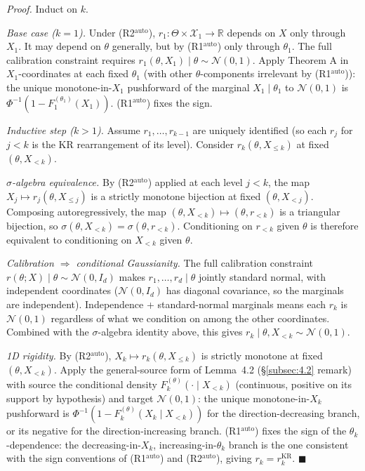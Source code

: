 \documentclass[11pt]{article}
\begin{document}
\emph{Proof.} Induct on \(k\).

\emph{Base case (\(k = 1\)).} Under (R2\(^\mathrm{auto}\)),
\(r_1: \Theta \times \mathcal{X}_1 \to \mathbb{R}\) depends on \(X\)
only through \(X_1\). It may depend on \(\theta\) generally, but by
(R1\(^\mathrm{auto}\)) only through \(\theta_1\). The full calibration
constraint requires
\(r_1(\theta, X_1) \mid \theta \sim \mathcal{N}(0,1)\). Apply Theorem A
in \(X_1\)-coordinates at each fixed \(\theta_1\) (with other
\(\theta\)-components irrelevant by (R1\(^\mathrm{auto}\))): the unique
monotone-in-\(X_1\) pushforward of the marginal \(X_1 \mid \theta_1\) to
\(\mathcal{N}(0,1)\) is \(\Phi^{-1}(1 - F_1^{(\theta_1)}(X_1))\).
(R1\(^\mathrm{auto}\)) fixes the sign.

\emph{Inductive step (\(k > 1\)).} Assume
\(r_1, \ldots, r_{k-1}\) are uniquely identified (so each \(r_j\) for
\(j < k\) is the KR rearrangement of its level). Consider
\(r_k(\theta, X_{\le k})\) at fixed \((\theta, X_{<k})\).

\emph{\(\sigma\)-algebra equivalence.} By (R2\(^\mathrm{auto}\)) applied
at each level \(j < k\), the map \(X_j \mapsto r_j(\theta, X_{\le j})\)
is a strictly monotone bijection at fixed \((\theta, X_{<j})\).
Composing autoregressively, the map
\((\theta, X_{<k}) \mapsto (\theta, r_{<k})\) is a triangular bijection,
so \(\sigma(\theta, X_{<k}) = \sigma(\theta, r_{<k})\). Conditioning on
\(r_{<k}\) given \(\theta\) is therefore equivalent to conditioning on
\(X_{<k}\) given \(\theta\).

\emph{Calibration $\Rightarrow$ conditional Gaussianity.} The full
calibration constraint \(r(\theta; X) \mid \theta \sim \mathcal{N}(0, I_d)\)
makes \(r_1, \ldots, r_d \mid \theta\) jointly standard normal, with
independent coordinates (\(\mathcal{N}(0, I_d)\) has diagonal covariance,
so the marginals are independent). Independence + standard-normal
marginals means each \(r_k\) is \(\mathcal{N}(0, 1)\) regardless of what
we condition on among the other coordinates. Combined with the
\(\sigma\)-algebra identity above, this gives
\(r_k \mid \theta, X_{<k} \sim \mathcal{N}(0, 1)\).

\emph{1D rigidity.} By (R2\(^\mathrm{auto}\)),
\(X_k \mapsto r_k(\theta, X_{\le k})\) is strictly monotone at fixed
\((\theta, X_{<k})\). Apply the general-source form of Lemma~4.2
(\S\ref{subsec:4.2} remark) with source the conditional density
\(F_k^{(\theta)}(\cdot \mid X_{<k})\) (continuous, positive on its
support by hypothesis) and target \(\mathcal{N}(0,1)\): the unique
monotone-in-\(X_k\) pushforward is
\(\Phi^{-1}(1 - F_k^{(\theta)}(X_k \mid X_{<k}))\) for the
direction-decreasing branch, or its negative for the
direction-increasing branch. (R1\(^\mathrm{auto}\)) fixes the sign of
the \(\theta_k\)-dependence: the decreasing-in-\(X_k\),
increasing-in-\(\theta_k\) branch is the one consistent with the sign
conventions of (R1\(^\mathrm{auto}\)) and (R2\(^\mathrm{auto}\)), giving
\(r_k = r_k^{\mathrm{KR}}\). \(\blacksquare\)
\end{document}
